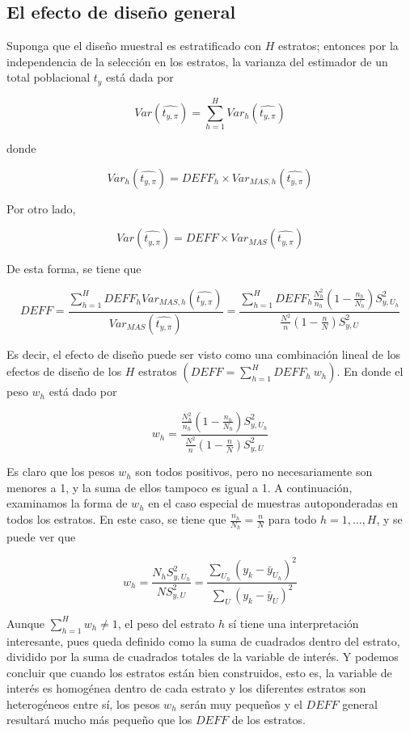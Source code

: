 \documentclass[
  12pt,
  spanish,
]{book}
\begin{document}
\hypertarget{el-efecto-de-diseuxf1o-general}{%
\subsection*{El efecto de diseño general}\label{el-efecto-de-diseuxf1o-general}}

Suponga que el diseño muestral es estratificado con \(H\) estratos; entonces por la independencia de la selección en los estratos, la varianza del estimador de un total poblacional \(t_y\) está dada por

\[
Var\left(\widehat{t_{y,\pi}}\right)=\sum_{h=1}^{H}Var_h\left(\widehat{t_{y,\pi}}\right)
\]

donde

\[
{Var}_h\left(\widehat{t_{y,\pi}}\right)={DEFF}_h \times {Var}_{MAS,h}\left(\widehat{t_{y,\pi}}\right)
\]

Por otro lado,

\[
Var\left(\widehat{t_{y,\pi}}\right)=DEFF \times {Var}_{MAS}\left(\widehat{t_{y,\pi}}\right)
\]

De esta forma, se tiene que

\[
DEFF=\frac{\sum_{h=1}^{H}DEFF_h{Var}_{MAS,h}\left(\widehat{t_{y,\pi}}\right)}{Var_{MAS}\left(\widehat{t_{y,\pi}}\right)}=\frac{\sum_{h=1}^{H}DEFF_h\frac{N_h^2}{n_h}(1-\frac{n_h}{N_h})S_{y,U_h}^2}{\frac{N^2}{n}(1-\frac{n}{N})S_{y,U}^2}
\]

Es decir, el efecto de diseño puede ser visto como una combinación lineal de los efectos de diseño de los \(H\) estratos \((DEFF=\sum_{h=1}^{H} DEFF_h \ w_h)\). En donde el peso \(w_h\) está dado por

\[
w_h=\frac{\frac{N_h^2}{n_h}(1-\frac{n_h}{N_h})S_{y,U_h}^2}{\frac{N^2}{n}(1-\frac{n}{N})S_{y,U}^2}
\]

Es claro que los pesos \(w_h\) son todos positivos, pero no necesariamente son menores a 1, y la suma de ellos tampoco es igual a 1. A continuación, examinamos la forma de \(w_h\) en el caso especial de muestras autoponderadas en todos los estratos. En este caso, se tiene que \(\frac{n_h}{N_h}=\frac{n}{N}\) para todo \(h=1,\ldots,H\), y se puede ver que

\[
w_h=\frac{N_hS_{y,U_h}^2}{NS_{y,U}^2}=\frac{\sum_{U_h}{(y_k-{\bar{y}}_{U_h})}^2}{\sum_{U}{(y_k-{\bar{y}}_U)}^2}
\]

Aunque \(\sum_{h=1}^{H}w_h\neq 1\), el peso del estrato \(h\) sí tiene una interpretación interesante, pues queda definido como la suma de cuadrados dentro del estrato, dividido por la suma de cuadrados totales de la variable de interés. Y podemos concluir que cuando los estratos están bien construidos, esto es, la variable de interés es homogénea dentro de cada estrato y los diferentes estratos son heterogéneos entre sí, los pesos \(w_h\) serán muy pequeños y el \(DEFF\) general resultará mucho más pequeño que los \(DEFF\) de los estratos.
\end{document}
